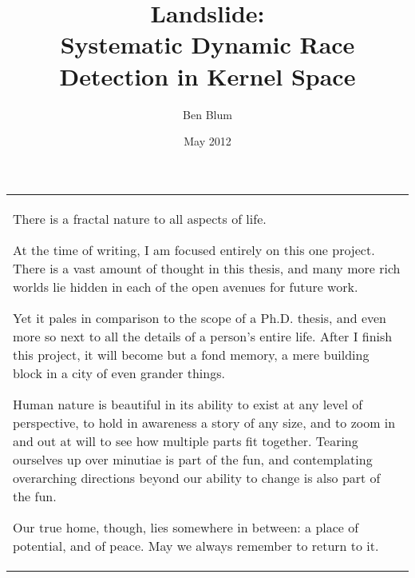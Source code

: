 \pagestyle{empty}

\title{\bf Landslide: \\
  Systematic Dynamic Race Detection in Kernel Space}
\author{Ben Blum}
\date{May 2012}






\maketitle

\begin{dedication}
\begin{tabular}{p{6in}}
\centering
There is a fractal nature to all aspects of life.

At the time of writing, I am focused entirely on this one project. There is a vast amount of thought in this thesis, and many more rich worlds lie hidden in each of the open avenues for future work.

Yet it pales in comparison to the scope of a Ph.D. thesis, and even more so next to all the details of a person's entire life.
After I finish this project, it will become but a fond memory, a mere building block in a city of even grander things.

Human nature is beautiful in its ability to exist at any level of perspective, to hold in awareness a story of any size, and to zoom in and out at will to see how multiple parts fit together.
Tearing ourselves up over minutiae is part of the fun, and contemplating overarching directions beyond our ability to change is also part of the fun.

Our true home, though, lies somewhere in between: a place of potential, and of peace. May we always remember to return to it.
\end{tabular}
\end{dedication}

\pagestyle{plain} %

